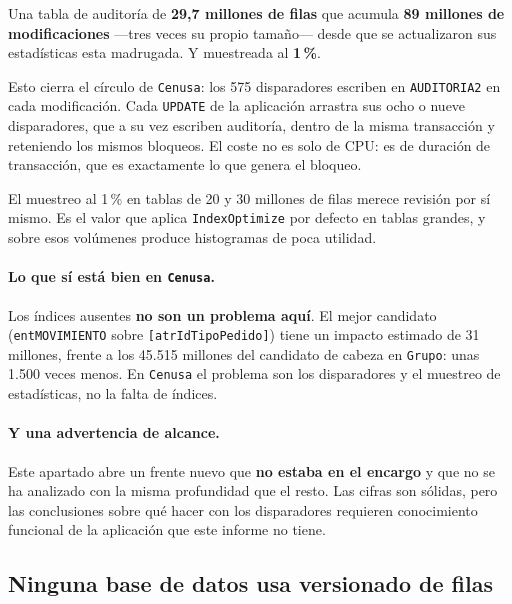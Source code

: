 \documentclass[11pt,a4paper]{article}
\newcommand{\cod}[1]{\texttt{\small #1}}
\begin{document}
Una tabla de auditoría de \textbf{29,7 millones de filas} que acumula
\textbf{89 millones de modificaciones} —tres veces su propio tamaño— desde
que se actualizaron sus estadísticas esta madrugada. Y muestreada al
\textbf{1\,\%}.

Esto cierra el círculo de \cod{Cenusa}: los 575 disparadores escriben en
\cod{AUDITORIA2} en cada modificación. Cada \cod{UPDATE} de la aplicación
arrastra sus ocho o nueve disparadores, que a su vez escriben auditoría,
dentro de la misma transacción y reteniendo los mismos bloqueos. El coste no
es solo de CPU: es de duración de transacción, que es exactamente lo que
genera el bloqueo.

El muestreo al 1\,\% en tablas de 20 y 30 millones de filas merece revisión
por sí mismo. Es el valor que aplica \cod{IndexOptimize} por defecto en
tablas grandes, y sobre esos volúmenes produce histogramas de poca utilidad.

\paragraph{Lo que sí está bien en \cod{Cenusa}.} Los índices ausentes
\textbf{no son un problema aquí}. El mejor candidato
(\cod{entMOVIMIENTO} sobre \cod{[atrIdTipoPedido]}) tiene un impacto estimado
de 31 millones, frente a los 45.515 millones del candidato de cabeza en
\cod{Grupo}: unas 1.500 veces menos. En \cod{Cenusa} el problema son los
disparadores y el muestreo de estadísticas, no la falta de índices.

\paragraph{Y una advertencia de alcance.} Este apartado abre un frente nuevo
que \textbf{no estaba en el encargo} y que no se ha analizado con la misma
profundidad que el resto. Las cifras son sólidas, pero las conclusiones sobre
qué hacer con los disparadores requieren conocimiento funcional de la
aplicación que este informe no tiene.

\subsection{Ninguna base de datos usa versionado de filas}
\end{document}
